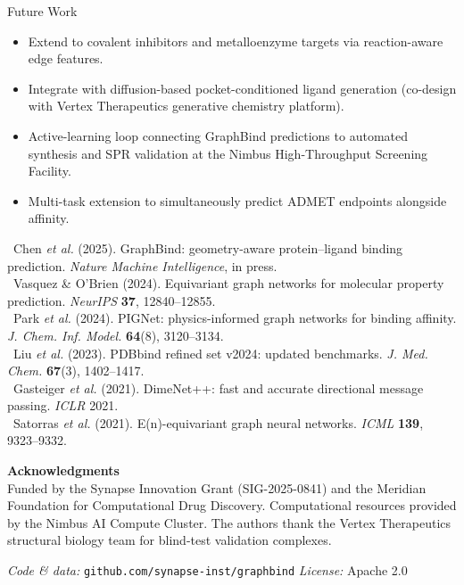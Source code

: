 \documentclass[14pt]{extarticle}
\begin{document}
\begin{minipage}[t]{0.31\textwidth}
\begin{accentblock}{Future Work}
\begin{itemize}[leftmargin=*, itemsep=6pt, topsep=6pt]
  \item Extend to covalent inhibitors and metalloenzyme targets via reaction-aware edge features.
  \item Integrate with diffusion-based pocket-conditioned ligand generation (co-design with Vertex
        Therapeutics generative chemistry platform).
  \item Active-learning loop connecting GraphBind predictions to automated synthesis and SPR validation
        at the Nimbus High-Throughput Screening Facility.
  \item Multi-task extension to simultaneously predict ADMET endpoints alongside affinity.
\end{itemize}
\end{accentblock}

\begin{refblock}
\fontsize{11}{15}\selectfont
\setlength{\parskip}{4pt}
\noindent
{}\rbrack\ Chen \textit{et al.} (2025). GraphBind: geometry-aware protein--ligand binding prediction.
\textit{Nature Machine Intelligence}, in press.\\
\rbrack\ Vasquez \& O'Brien (2024). Equivariant graph networks for molecular property prediction.
\textit{NeurIPS} \textbf{37}, 12840--12855.\\
\rbrack\ Park \textit{et al.} (2024). PIGNet: physics-informed graph networks for binding affinity.
\textit{J. Chem. Inf. Model.} \textbf{64}(8), 3120--3134.\\
\rbrack\ Liu \textit{et al.} (2023). PDBbind refined set v2024: updated benchmarks.
\textit{J. Med. Chem.} \textbf{67}(3), 1402--1417.\\
\rbrack\ Gasteiger \textit{et al.} (2021). DimeNet++: fast and accurate directional message passing.
\textit{ICLR} 2021.\\
\rbrack\ Satorras \textit{et al.} (2021). E(n)-equivariant graph neural networks.
\textit{ICML} \textbf{139}, 9323--9332.
\end{refblock}

\vspace{14pt}
\begin{center}
\fontsize{13}{17}\selectfont\color{primary!70}
\textbf{Acknowledgments}\\[4pt]
Funded by the Synapse Innovation Grant (SIG-2025-0841) and the Meridian Foundation for Computational Drug Discovery.
Computational resources provided by the Nimbus AI Compute Cluster. The authors thank the Vertex Therapeutics
structural biology team for blind-test validation complexes.

\vspace{8pt}
\textit{Code \& data:} \texttt{github.com/synapse-inst/graphbind} \quad
\textit{License:} Apache 2.0
\end{center}

\end{minipage}
\end{document}
